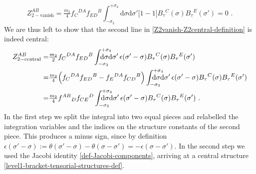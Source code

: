 \documentclass[12pt]{article}
\numberwithin{equation}{section}
\begin{document}
\begin{equation}
Z_{2-\text{vanish}}^{AB}\!\!=\tfrac{m_{2}}{4}f_{C}{}^{DA}\!f_{ED}{}^{B}\!\!\!\int_{-\sigma_{3}}^{+\sigma_{4}}\!\!\!\!\!\!\!\!\!\!\!\mathrm{d}\sigma\mathrm{d}\sigma'  \bigl[ 1-1\bigr]\!B_{\tau}{}^{C}\!(\sigma)B_{\tau}{}^{E}\!(\sigma') = 0 \,\, .
\end{equation}
We are thus left to show that the second line in \eqref{Z2vanish-Z2central-definition} is indeed central:
\begin{equation}
\begin{aligned}
Z_{2-\text{central}}^{AB}=&\tfrac{m_{2}}{2}f_{C}{}^{DA}f_{ED}{}^{B}\int_{-\sigma_{3}}^{+\sigma_{4}}\!\!\!\!\!\!\!\!\!\!\!\mathrm{d}\sigma\mathrm{d}\sigma' \, \epsilon(\sigma'-\sigma)B_{\tau}{}^{C}(\sigma)B_{\tau}{}^{E}(\sigma')
\\
=&\tfrac{m_{2}}{4}\Bigl(f_{C}{}^{DA}f_{ED}{}^{B}-f_{E}{}^{DA}f_{CD}{}^{B}\Bigr)\int_{-\sigma_{3}}^{+\sigma_{4}}\!\!\!\!\!\!\!\!\!\!\!\mathrm{d}\sigma\mathrm{d}\sigma' \, \epsilon(\sigma'-\sigma)B_{\tau}{}^{C}(\sigma)B_{\tau}{}^{E}(\sigma')
\\
=&\tfrac{m_{2}}{4}f^{AB}{}_{D}f_{CE}{}^{D}\int_{-\sigma_{3}}^{+\sigma_{4}}\!\!\!\!\!\!\!\!\!\!\!\mathrm{d}\sigma\mathrm{d}\sigma' \, \epsilon(\sigma'-\sigma)B_{\tau}{}^{C}(\sigma)B_{\tau}{}^{E}(\sigma') \,\, .
\end{aligned}
\end{equation}
In the first step we split the integral into two equal pieces and relabelled the integration variables and the indices on the structure constants of the second piece. This produces a minus sign, since by definition $\epsilon(\sigma'-\sigma):=\theta(\sigma'-\sigma)-\theta(\sigma-\sigma')=-\epsilon(\sigma-\sigma')$. In the second step we used the Jacobi identity \eqref{def-Jacobi-components}, arriving at a central structure \eqref{level1-bracket-tensorial-structures-def}.
\end{document}
